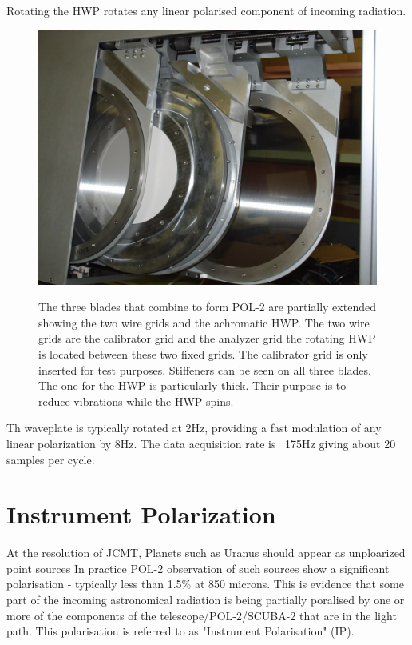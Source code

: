 Rotating the HWP rotates any linear polarised component of incoming radiation.



\begin{figure}[t!]
\begin{center}
\includegraphics[width=0.7\linewidth]{pol2-three-components.png}
\label{fig:pol2components}
\caption [POL-2 components]{
  \small The three blades that combine to form POL-2 are partially
  extended showing the two wire grids and the achromatic HWP.
  The two wire grids are the calibrator grid and the analyzer grid
  the rotating HWP is located between these two fixed grids.
  The calibrator grid is only inserted for test purposes.
  Stiffeners can be seen on all three blades. The one for the HWP 
  is particularly thick. Their purpose is to reduce vibrations while
  the HWP spins.
}
\end{center}
\end{figure}

Th waveplate is typically rotated at 2Hz, providing a fast modulation of any linear polarization by 8Hz.
The data acquisition rate is ~175Hz giving about 20 samples per cycle. 



\section{Instrument Polarization}

At the resolution of JCMT, Planets such as Uranus should appear as unploarized point sources
In practice POL-2 observation of such sources show a significant polarisation - typically less 
than 1.5\% at 850 microns. This is evidence that some part of the incoming astronomical radiation 
is being partially poralised by one or more of the components of the telescope/POL-2/SCUBA-2 
that are in the light path. This polarisation is referred to as "Instrument Polarisation" (IP).

